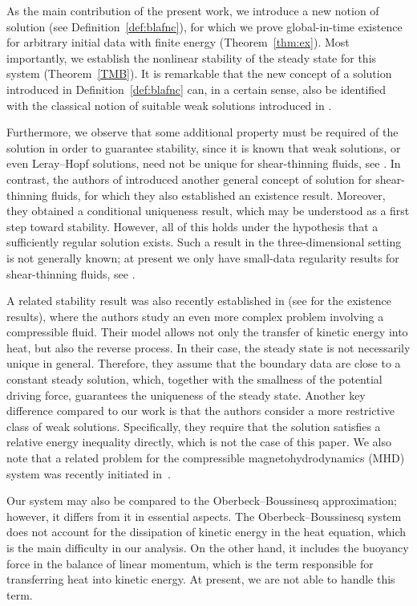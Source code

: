 \documentclass[11pt, a4paper, reqno]{amsart}
\numberwithin{equation}{section}
\begin{document}
As the main contribution of the present work, we introduce a new notion of solution (see Definition~\ref{def:blafnc}), for which we prove global-in-time existence for arbitrary initial data with finite energy (Theorem~\ref{thm:ex}). Most importantly, we establish the nonlinear stability of the steady state for this system (Theorem~\ref{TMB}). It is remarkable that the new concept of a solution introduced in Definition~\ref{def:blafnc} can, in a certain sense, also be identified with the classical notion of suitable weak solutions introduced in \cite{CaKoNi82}.

Furthermore, we observe that some additional property must be required of the solution in order to guarantee stability, since it is known that weak solutions, or even Leray--Hopf solutions, need not be unique for shear-thinning fluids, see \cite{BuMoSz21}. In contrast, the authors of \cite{AbFe2020} introduced another general concept of solution for shear-thinning fluids, for which they also established an existence result. Moreover, they obtained a conditional uniqueness result, which may be understood as a first step toward stability. However, all of this holds under the hypothesis that a sufficiently regular solution exists. Such a result in the three-dimensional setting is not generally known; at present we only have small-data regularity results for shear-thinning fluids, see \cite{AM19, BeDieRu2010}.


A related stability result was also recently established in \cite{FeLuSu2024}  (see \cite{FeNo2022-kniha} for the existence results), where the authors study an even more complex problem involving a compressible fluid. Their model allows not only the transfer of kinetic energy into heat, but also the reverse process. In their case, the steady state is not necessarily unique in general. Therefore, they assume that the boundary data are close to a constant steady solution, which, together with the smallness of the potential driving force, guarantees the uniqueness of the steady state. Another key difference compared to our work is that the authors consider a more restrictive class of weak solutions. Specifically, they require that the solution satisfies a relative energy inequality directly, which is not the case of this paper. 
We also note that a related problem for the compressible magnetohydrodynamics (MHD) system was recently initiated in~\cite{FeGwiaKwonSwie2023}.




Our system may also be compared to the Oberbeck--Boussinesq approximation; however, it differs from it in essential aspects. The Oberbeck--Boussinesq system does not account for the dissipation of kinetic energy in the heat equation, which is the main difficulty in our analysis. On the other hand, it includes the buoyancy force in the balance of linear momentum, which is the term responsible for transferring heat into kinetic energy. At present, we are not able to handle this term.
\end{document}
